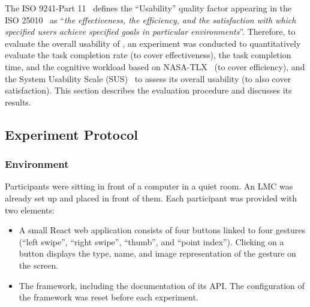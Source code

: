 The ISO 9241-Part 11~\cite{iso9241} defines the ``Usability'' quality factor appearing in the ISO 25010~\cite{iso25010} as ``\textit{the effectiveness, the efficiency,  and the satisfaction with which specified users achieve specified goals in particular environments}''. Therefore, to evaluate the overall usability of \ql, an experiment was conducted to quantitatively evaluate the task completion rate (to cover effectiveness), the task completion time, and the cognitive workload based on NASA-TLX~\cite{Hart:1988} (to cover efficiency), and the System Usability Scale (SUS)~\cite{Brooke:1996} to assess its overall usability (to also cover satisfaction). This section describes the evaluation procedure and discusses its results.

\subsection{Experiment Protocol} \label{sec:quantumleap:evaluation:protocol}

\subsubsection{Environment}
Participants were sitting in front of a computer in a quiet room. An LMC was already set up and placed in front of them. Each participant was provided with two elements: 
\begin{itemize}
    \item A small React web application consists of four buttons linked to four gestures (``left swipe'', ``right swipe'', ``thumb'', and ``point index''). Clicking on a button displays the type, name, and image representation of the gesture on the screen.
    \item The \ql framework, including the documentation of its API. The configuration of the framework was reset before each experiment.
\end{itemize}


